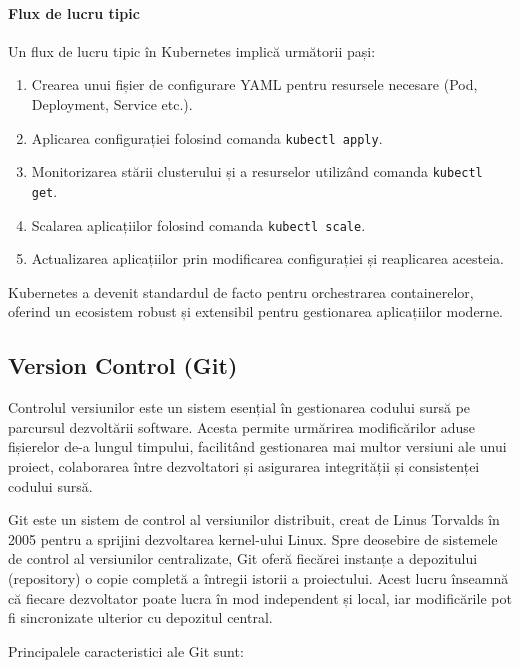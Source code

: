 \documentclass[titlepage,12pt]{article}
\begin{document}
\paragraph{Flux de lucru tipic}
Un flux de lucru tipic în Kubernetes implică următorii pași:
\begin{enumerate}
    \item Crearea unui fișier de configurare YAML pentru resursele necesare (Pod, Deployment, Service etc.).
    \item Aplicarea configurației folosind comanda \texttt{kubectl apply}.
    \item Monitorizarea stării clusterului și a resurselor utilizând comanda \texttt{kubectl get}.
    \item Scalarea aplicațiilor folosind comanda \texttt{kubectl scale}.
    \item Actualizarea aplicațiilor prin modificarea configurației și reaplicarea acesteia.
\end{enumerate}

Kubernetes a devenit standardul de facto pentru orchestrarea containerelor, oferind un ecosistem robust și extensibil pentru gestionarea aplicațiilor moderne.

\subsection{Version Control (Git)}

Controlul versiunilor este un sistem esențial în gestionarea codului sursă pe parcursul dezvoltării software. Acesta permite urmărirea modificărilor aduse fișierelor de-a lungul timpului, facilitând gestionarea mai multor versiuni ale unui proiect, colaborarea între dezvoltatori și asigurarea integrității și consistenței codului sursă.

Git este un sistem de control al versiunilor distribuit, creat de Linus Torvalds în 2005 pentru a sprijini dezvoltarea kernel-ului Linux. Spre deosebire de sistemele de control al versiunilor centralizate, Git oferă fiecărei instanțe a depozitului (repository) o copie completă a întregii istorii a proiectului. Acest lucru înseamnă că fiecare dezvoltator poate lucra în mod independent și local, iar modificările pot fi sincronizate ulterior cu depozitul central.

Principalele caracteristici ale Git sunt:
\end{document}
